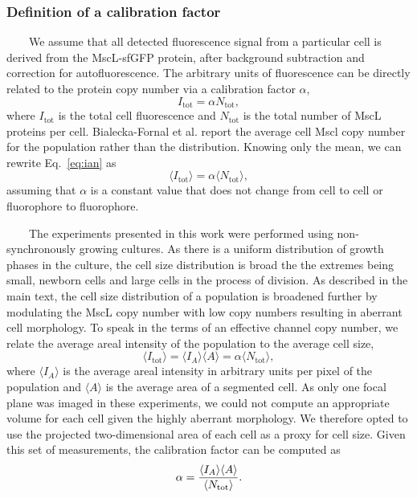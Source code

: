 \subsubsection{Definition
of a
calibration
factor}\label{definition-of-a-calibration-factor}

~~~~We
assume
that
all
detected
fluorescence
signal
from a
particular
cell
is
derived
from
the
MscL-sfGFP
protein,
after
background
subtraction
and
correction
for
autofluorescence.
The
arbitrary
units
of
fluorescence
can be
directly
related
to the
protein
copy
number
via a
calibration
factor
\(\alpha\),
\begin{equation}
I_\text{tot} = \alpha N_\text{tot},
\label{eq:ian}\end{equation}
where
\(I_\text{tot}\)
is the
total
cell
fluorescence
and
\(N_\text{tot}\)
is the
total
number
of
MscL
proteins
per
cell.
Bialecka-Fornal
et al.
report
the
average
cell
Mscl
copy
number
for
the
population
rather
than
the
distribution.
Knowing
only
the
mean,
we can
rewrite
Eq.~\ref{eq:ian}
as
\begin{equation}
\langle I_\text{tot}\rangle = \alpha \langle N_\text{tot} \rangle,
\label{eq:avg_ian}\end{equation}
assuming
that
\(\alpha\)
is a
constant
value
that
does
not
change
from
cell
to
cell
or
fluorophore
to
fluorophore.

~~~~The
experiments
presented
in
this
work
were
performed
using
non-synchronously
growing
cultures.
As
there
is a
uniform
distribution
of
growth
phases
in the
culture,
the
cell
size
distribution
is
broad
the
the
extremes
being
small,
newborn
cells
and
large
cells
in the
process
of
division.
As
described
in the
main
text,
the
cell
size
distribution
of a
population
is
broadened
further
by
modulating
the
MscL
copy
number
with
low
copy
numbers
resulting
in
aberrant
cell
morphology.
To
speak
in the
terms
of an
effective
channel
copy
number,
we
relate
the
average
areal
intensity
of the
population
to the
average
cell
size,
\begin{equation}
\langle I_\text{tot} \rangle = \langle I_A \rangle \langle A \rangle = \alpha \langle N_\text{tot} \rangle,
\label{eq:area_conversion}\end{equation}
where
\(\langle I_A\rangle\)
is the
average
areal
intensity
in
arbitrary
units
per
pixel
of the
population
and
\(\langle A \rangle\)
is the
average
area
of a
segmented
cell.
As
only
one
focal
plane
was
imaged
in
these
experiments,
we
could
not
compute
an
appropriate
volume
for
each
cell
given
the
highly
aberrant
morphology.
We
therefore
opted
to use
the
projected
two-dimensional
area
of
each
cell
as a
proxy
for
cell
size.
Given
this
set of
measurements,
the
calibration
factor
can be
computed
as
\begin{equation}
\alpha = {\langle I_A \rangle\langle A \rangle \over \langle N_\text{tot} \rangle}.
\label{eq:simple_cal_factor}\end{equation}

